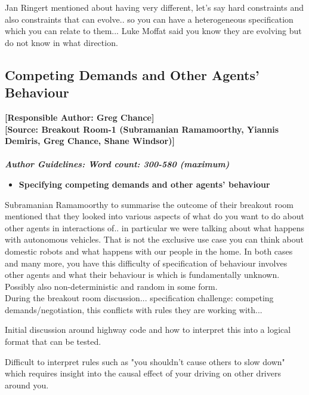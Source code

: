 \documentclass[sigconf]{acmart}
\begin{document}
Jan Ringert mentioned about having very different, let's say hard constraints and also constraints that can evolve.. so you can have a heterogeneous specification which you can relate to them... Luke Moffat said you know they are evolving but do not know in what direction. 

\subsection{Competing Demands and Other Agents' Behaviour}
\noindent\textbf{[Responsible Author:  Greg Chance]}\\
\noindent \textbf{[Source: Breakout Room-1 (Subramanian Ramamoorthy, Yiannis Demiris, Greg Chance, Shane Windsor)]}\\\\
\noindent\textbf{\textit{Author Guidelines: Word count: 300-580 (maximum)}}\\
\begin{itemize}
 	\item \textbf{Specifying competing demands and other agents' behaviour}
 \end{itemize}
Subramanian Ramamoorthy to summarise the outcome of their breakout room mentioned that they looked into various aspects of what do you want to do about other agents in interactions of.. in particular we were talking about what happens with autonomous vehicles. That is not the exclusive use case you can think about domestic robots and what happens with our people in the home. In both cases and many more, you have this difficulty of specification of behaviour involves other agents and what their behaviour is which is fundamentally unknown. Possibly also non-deterministic and random in some form.\\

During the breakout room discussion... specification challenge: competing demands/negotiation, this conflicts with rules they are working with...

Initial discussion around highway code and how to interpret this into a logical format that can be tested.

Difficult to interpret rules such as "you shouldn't cause others to slow down" which requires insight into the causal effect of your driving on other drivers around you.
\end{document}
